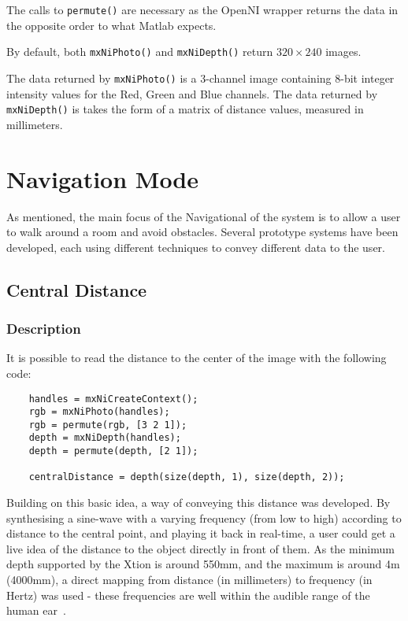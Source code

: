 The calls to \texttt{permute()} are necessary as the OpenNI wrapper returns the data in the opposite order to what Matlab expects.

By default, both \texttt{mxNiPhoto()} and \texttt{mxNiDepth()} return $320\times240$ images.

The data returned by \texttt{mxNiPhoto()} is a 3-channel image containing 8-bit integer intensity values for the Red, Green and Blue channels.
The data returned by \texttt{mxNiDepth()} is takes the form of a matrix of distance values, measured in millimeters.

\section{Navigation Mode}
As mentioned, the main focus of the Navigational of the system is to allow a user to walk around a room and avoid obstacles. Several prototype systems have been developed, each using different techniques to convey different data to the user.

\subsection{Central Distance}
\label{sec:centraldistance}
\subsubsection{Description}
It is possible to read the distance to the center of the image with the following code:

\begin{verbatim}
    handles = mxNiCreateContext();
    rgb = mxNiPhoto(handles);
    rgb = permute(rgb, [3 2 1]);
    depth = mxNiDepth(handles);
    depth = permute(depth, [2 1]);
    
    centralDistance = depth(size(depth, 1), size(depth, 2));
\end{verbatim}


Building on this basic idea, a way of conveying this distance was developed. By synthesising a sine-wave with a varying frequency (from low to high) according to distance to the central point, and playing it back in real-time, a user could get a live idea of the distance to the object directly in front of them. As the minimum depth supported by the Xtion is around 550mm, and the maximum is around 4m (4000mm), a direct mapping from distance (in millimeters) to frequency (in Hertz) was used - these frequencies are well within the audible range of the human ear~\cite{hearingrange}.

